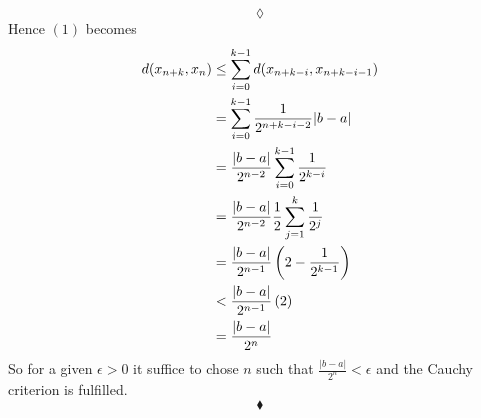 $$\lozenge$$
Hence $(1)$ becomes
\begin{align*}
d(x_{n+k}, x_{n})&\leq \sum_{i=0}^{k-1}d(x_{n+k-i}, x_{n+k-i-1})\\
&= \sum_{i=0}^{k-1}\frac{1}{2^{n+k-i-2}}|b-a|\\
&= \frac{|b-a|}{2^{n-2}}\sum_{i=0}^{k-1}\frac{1}{2^{k-i}}\\
&= \frac{|b-a|}{2^{n-2}}\frac{1}{2}\sum_{j=1}^{k}\frac{1}{2^{j}}\\
&= \frac{|b-a|}{2^{n-1}}\left(2-\frac{1}{2^{k-1}}\right)\\
&< \frac{|b-a|}{2^{n-1}}\left(2\right)\\
&= \frac{|b-a|}{2^{n}}
\end{align*}
So for a given $\epsilon>0$ it suffice to chose $n$ such that  $\frac{|b-a|}{2^{n}}<\epsilon$ and the Cauchy criterion is fulfilled.
$$\blacklozenge$$\\
